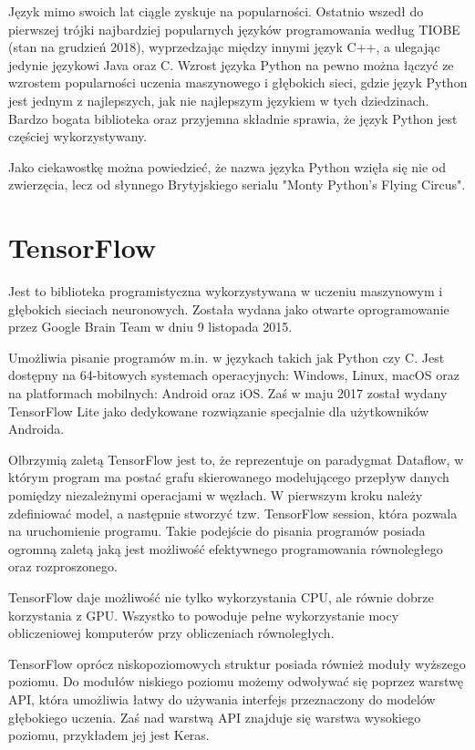 \documentclass[a4paper,12pt,twoside,openany]{report}
\begin{document}
Język mimo swoich lat ciągle zyskuje na popularności. Ostatnio wszedł do pierwszej trójki najbardziej popularnych języków programowania według TIOBE (stan na grudzień 2018), wyprzedzając między innymi język C++, a ulegając jedynie językowi Java oraz C. Wzrost języka Python na pewno można łączyć ze wzrostem popularności uczenia maszynowego i głębokich sieci, gdzie język Python jest jednym z najlepszych, jak nie najlepszym językiem w tych dziedzinach. Bardzo bogata biblioteka oraz przyjemna składnie sprawia, że język Python jest częściej wykorzystywany.  

Jako ciekawostkę można powiedzieć, że nazwa języka Python wzięła się nie od zwierzęcia, lecz od słynnego Brytyjskiego serialu "Monty Python’s Flying Circus".

\section{TensorFlow}
Jest to biblioteka programistyczna wykorzystywana w uczeniu maszynowym i głębokich sieciach neuronowych. Została wydana jako otwarte oprogramowanie przez Google Brain Team w dniu 9 listopada 2015.

Umożliwia pisanie programów m.in. w językach takich jak Python czy C. Jest dostępny na 64-bitowych systemach operacyjnych: Windows, Linux, macOS oraz na platformach mobilnych: Android oraz iOS. Zaś w maju 2017 został wydany TensorFlow Lite jako dedykowane rozwiązanie specjalnie dla użytkowników Androida.

Olbrzymią zaletą TensorFlow jest to, że reprezentuje on paradygmat Dataflow, w którym program ma postać grafu skierowanego modelującego przepływ danych pomiędzy niezależnymi operacjami w węzłach. W pierwszym kroku należy zdefiniować model, a następnie stworzyć tzw. TensorFlow session, która pozwala na uruchomienie programu. Takie podejście do pisania programów posiada ogromną zaletą jaką jest możliwość efektywnego programowania równoległego oraz rozproszonego. 

TensorFlow daje możliwość nie tylko wykorzystania CPU, ale równie dobrze korzystania z GPU. Wszystko to powoduje pełne wykorzystanie mocy obliczeniowej komputerów przy obliczeniach równoległych.

TensorFlow oprócz niskopoziomowych struktur posiada również moduły wyższego poziomu. Do modułów niskiego poziomu możemy odwoływać się poprzez warstwę API, która umożliwia łatwy do używania interfejs przeznaczony do modelów głębokiego uczenia. Zaś nad warstwą API znajduje się warstwa wysokiego poziomu, przykładem jej jest Keras.
\end{document}
